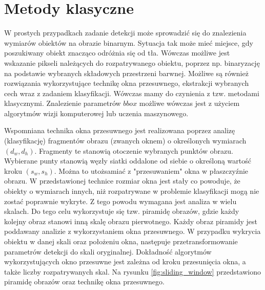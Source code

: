 \section{Metody klasyczne}

W prostych przypadkach zadanie detekcji może sprowadzić się do znalezienia wymiarów obiektów na obrazie binarnym.
Sytuacja tak może mieć miejsce, gdy poszukiwany obiekt znacząco odróżnia się od tła.
Wówczas możliwe jest wskazanie pikseli należących do rozpatrywanego obiektu, poprzez np. binaryzację na podstawie wybranych składowych przestrzeni barwnej.
Możliwe są również rozwiązania wykorzystujące technikę okna przesuwnego, ekstrakcji wybranych cech wraz z zadaniem klasyfikacji.
Wówczas mamy do czynienia z tzw. metodami klasycznymi.
Znalezienie parametrów $bbox$ możliwe wówczas jest z użyciem algorytmów wizji komputerowej lub uczenia maszynowego.

Wspomniana technika okna przesuwnego jest realizowana poprzez analizę (klasyfikację) fragmentów obrazu (zwanych oknem) o określonych wymiarach $(d_w,d_h)$. 
Fragmenty te stanowią otoczenie wybranych punktów obrazu.
Wybierane punty stanowią węzły siatki oddalone od siebie o określoną wartość kroku $(s_w,s_h)$. 
Można to utożsamiać z "przesuwaniem" okna w płaszczyźnie obrazu.
W przedstawionej technice rozmiar okna jest stały co powoduje, że obiekty o wymiarach innych, niż 
rozpatrywane w problemie klasyfikacji mogą nie zostać poprawnie wykryte.
Z tego powodu wymagana jest analiza w wielu skalach.
Do tego celu wykorzystuje się tzw. piramidę obrazów, gdzie każdy kolejny obraz stanowi inną skalę obrazu pierwotnego.
Każdy obraz piramidy jest poddawany analizie z wykorzystaniem okna przesuwnego.
W przypadku wykrycia obiektu w danej skali oraz położeniu okna, następuje przetransformowanie parametrów detekcji do skali oryginalnej.
Dokładność algorytmów wykorzystujących okno przesuwne jest zależna od kroku przesunięcia okna, a także liczby rozpatrywanych skal.
Na rysunku \ref{fig:sliding_window} przedstawiono piramidę obrazów oraz technikę okna przesuwnego.

